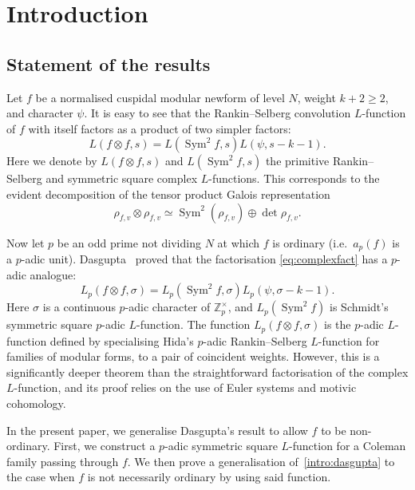 \documentclass[11pt, a4paper, reqno]{amsart}
\theoremstyle{definition}
\theoremstyle{plain}
\theoremstyle{remark}
\DeclareMathOperator{\Sym}{Sym}
\newcommand{\numberset}{\mathbb}
\newcommand{\Z}{\numberset{Z}}
\renewcommand{\ge}{\geqslant}
\begin{document}
\section{Introduction}

 \subsection{Statement of the results}

  Let $f$ be a normalised cuspidal modular newform of level $N$, weight $k + 2 \ge 2$, and character $\psi$. It is easy to see that the Rankin--Selberg convolution $L$-function of $f$ with itself factors as a product of two simpler factors:
  \begin{equation}
   \label{eq:complexfact}
   L(f\otimes f,s) = L(\Sym^2 f,s)L(\psi,s-k-1).
  \end{equation}
  Here we denote by $L(f\otimes f, s)$ and $L(\Sym^2 f, s)$ the primitive Rankin--Selberg and symmetric square complex $L$-functions. This corresponds to the evident decomposition of the tensor product Galois representation
  \begin{equation}
   \label{eq:decomposition-rho}
   \rho_{f,v} \otimes \rho_{f,v} \simeq \Sym^2(\rho_{f,v}) \oplus \det \rho_{f,v}.
  \end{equation}

  Now let $p$ be an odd prime not dividing $N$ at which $f$ is ordinary (i.e.~$a_p(f)$ is a $p$-adic unit). Dasgupta~\cite{Dasgupta-factorization} proved that the factorisation \eqref{eq:complexfact} has a $p$-adic analogue:
  \begin{equation}
   \label{intro:dasgupta}
   L_p(f\otimes f,\sigma) = L_p(\Sym^2 f,\sigma) L_p(\psi,\sigma - k - 1).
  \end{equation}
  Here $\sigma$ is a continuous $p$-adic character of $\Z_p^\times$, and $L_p(\Sym^2 f)$ is Schmidt's symmetric square $p$-adic $L$-function. The function $L_p(f\otimes f, \sigma)$ is the $p$-adic $L$-function defined by specialising Hida's $p$-adic Rankin--Selberg $L$-function for families of modular forms, to a pair of coincident weights. However, this is a significantly deeper theorem than the straightforward factorisation of the complex $L$-function, and its proof relies on the use of Euler systems and motivic cohomology.

  In the present paper, we generalise Dasgupta's result to allow $f$ to be non-ordinary. First, we construct a $p$-adic symmetric square $L$-function for a Coleman family passing through $f$. We then prove a generalisation of~\eqref{intro:dasgupta} to the case when $f$ is not necessarily ordinary by using said function.
\end{document}
